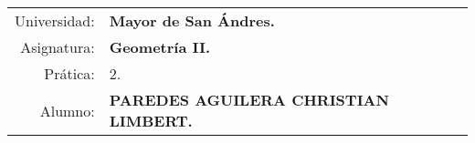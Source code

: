 \begin{tabular}{r l }
Universidad: & \textbf{Mayor de San Ándres.}\\
Asignatura: & \textbf{Geometría II.}\\
Prática: & 2.\\ 
Alumno: & \textbf{PAREDES AGUILERA CHRISTIAN LIMBERT.}
\end{tabular}
\begin{flushleft}
\end{flushleft}
\vspace{.2cm}
